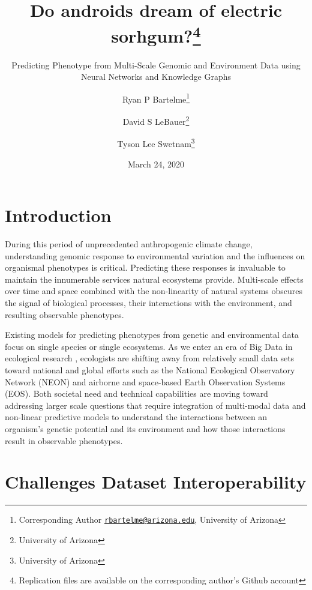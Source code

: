 \documentclass[12pt,]{article}
\title{Do androids dream of electric sorhgum?\thanks{Replication files are available on the corresponding author's Github
account}}
\subtitle{Predicting Phenotype from Multi-Scale Genomic and Environment Data using
Neural Networks and Knowledge Graphs}
\author{Ryan P Bartelme\footnote{Corresponding Author
  \href{mailto:rbartelme@arizona.edu}{\nolinkurl{rbartelme@arizona.edu}},
  University of Arizona} \and David S LeBauer\footnote{University of Arizona} \and Tyson Lee Swetnam\footnote{University of Arizona}}
\date{March 24, 2020}
\begin{document}
\maketitle

\hypertarget{introduction}{%
\section{Introduction}\label{introduction}}

During this period of unprecedented anthropogenic climate change,
understanding genomic response to environmental variation and the
influences on organismal phenotypes is critical. Predicting these
responses is invaluable to maintain the innumerable services natural
ecosystems provide. Multi-scale effects over time and space combined
with the non-linearity of natural systems
\citep{lorenz1963deterministic, ruel1999jensen, west2009general}
obscures the signal of biological processes, their interactions with the
environment, and resulting observable phenotypes.

Existing models for predicting phenotypes from genetic and environmental
data focus on single species or single ecosystems. As we enter an era of
Big Data in ecological research \citep{balch2020neon}, ecologists are
shifting away from relatively small data sets toward national and global
efforts such as the National Ecological Observatory Network (NEON)
\citep{keller2008continental} and airborne and space-based Earth
Observation Systems (EOS). Both societal need and technical capabilities
are moving toward addressing larger scale questions that require
integration of multi-modal data and non-linear predictive models to
understand the interactions between an organism's genetic potential and
its environment and how those interactions result in observable
phenotypes.

\hypertarget{challenges-dataset-interoperability}{%
\section{Challenges Dataset
Interoperability}\label{challenges-dataset-interoperability}}
\end{document}
